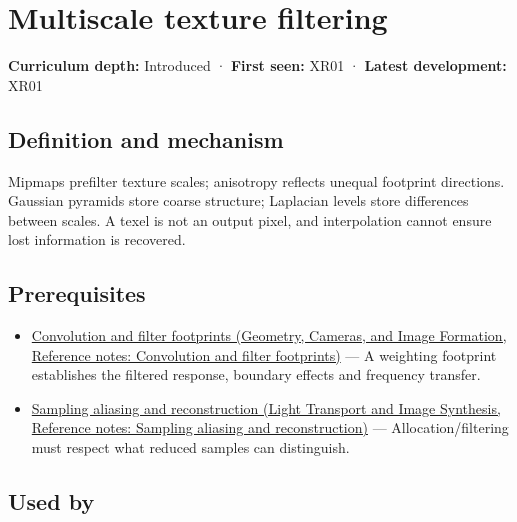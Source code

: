 \hypertarget{appendix-b677a85ba76f}{}\label{referencestart:appendix-b677a85ba76f}
\section{Multiscale texture filtering}\label{appendix-b677a85ba76f-multiscale-texture-filtering}

\textbf{Curriculum depth:} Introduced · \textbf{First seen:} XR01 · \textbf{Latest development:} XR01

\begin{allmightroledefinition}

\subsection{Definition and mechanism}\label{appendix-b677a85ba76f-definition-and-mechanism}

Mipmaps prefilter texture scales; anisotropy reflects unequal footprint directions. Gaussian pyramids store coarse structure; Laplacian levels store differences between scales. A texel is not an output pixel, and interpolation cannot ensure lost information is recovered.

\end{allmightroledefinition}

\subsection{Prerequisites}\label{appendix-b677a85ba76f-prerequisites}

\begin{itemize}
\tightlist
\item
  \href{../03-Geometry-Cameras-and-Image-Formation/main.pdf\#nameddest=appendix-d5b3c692d9f0}{Convolution and filter footprints (Geometry, Cameras, and Image Formation, Reference notes: Convolution and filter footprints)} --- A weighting footprint establishes the filtered response, boundary effects and frequency transfer.
\item
  \href{../04-Light-Transport-and-Image-Synthesis/main.pdf\#nameddest=appendix-6a7869dd79a6}{Sampling aliasing and reconstruction (Light Transport and Image Synthesis, Reference notes: Sampling aliasing and reconstruction)} --- Allocation/filtering must respect what reduced samples can distinguish.
\end{itemize}

\subsection{Used by}\label{appendix-b677a85ba76f-used-by}

